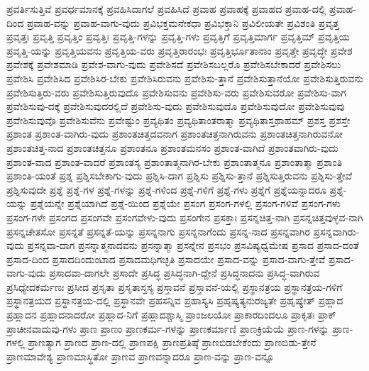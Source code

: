 {ಪ್ರವರ್ತಿಸುತ್ತಿವೆ
ಪ್ರವರ್ಧಮಾನಕ್ಕೆ
ಪ್ರವಹಿಸಿದಾಗಲೆ
ಪ್ರವಹಿಸಿದೆ
ಪ್ರವಾಹ
ಪ್ರವಾಹಕ್ಕೆ
ಪ್ರವಾಹದ
ಪ್ರವಾಹ-ದಲ್ಲಿ
ಪ್ರವಾಹ-ದಿಂದ
ಪ್ರವಾಹ-ವನ್ನು
ಪ್ರವಾಹ-ವಾಗು-ವುದು
ಪ್ರವಿಭಕ್ತಮನೇಕಧಾ
ಪ್ರವಿಭಕ್ತಾನಿ
ಪ್ರವಿಲೀಯತೇ
ಪ್ರವಿಶಂತಿ
ಪ್ರವೃತ್ತ
ಪ್ರವೃತ್ತಃ
ಪ್ರವೃತ್ತಿ
ಪ್ರವೃತ್ತಿಂ
ಪ್ರವೃತ್ತಿಃ
ಪ್ರವೃತ್ತಿ-ಗಳನ್ನು
ಪ್ರವೃತ್ತಿ-ಗಳು
ಪ್ರವೃತ್ತಿಗೆ
ಪ್ರವೃತ್ತಿಮಾರ್ಗ
ಪ್ರವೃತ್ತಿಮ್
ಪ್ರವೃತ್ತಿಯ
ಪ್ರವೃತ್ತಿ-ಯನ್ನು
ಪ್ರವೃತ್ತಿಯವನು
ಪ್ರವೃತ್ತಿಯ-ವರು
ಪ್ರವೃತ್ತಿರಾರಂಭಃ
ಪ್ರವೃತ್ತಿರ್ಭೂತಾನಾಂ
ಪ್ರವೃತ್ತೇ
ಪ್ರವೃದ್ಧೇ
ಪ್ರವೇಶ
ಪ್ರವೇಶಕ್ಕೆ
ಪ್ರವೇಶಮಾಡಿ
ಪ್ರವೇಶ-ವಾಗು-ವುದು
ಪ್ರವೇಶಿಸದೆ
ಪ್ರವೇಶಿಸಬಲ್ಲರೊ
ಪ್ರವೇಶಿಸಬೇಕಾದರೆ
ಪ್ರವೇಶಿಸಲು
ಪ್ರವೇಶಿಸಿ
ಪ್ರವೇಶಿಸಿದ
ಪ್ರವೇಶಿಸಿರ-ಬೇಕು
ಪ್ರವೇಶಿಸಿರುವನು
ಪ್ರವೇಶಿಸು-ತ್ತಾನೆ
ಪ್ರವೇಶಿಸುತ್ತಾನೆಯೋ
ಪ್ರವೇಶಿಸುತ್ತಿರುವನು
ಪ್ರವೇಶಿಸುತ್ತಿರು-ವರು
ಪ್ರವೇಶಿಸುತ್ತಿರುವುದೊ
ಪ್ರವೇಶಿಸುವನು
ಪ್ರವೇಶಿಸು-ವರು
ಪ್ರವೇಶಿಸುವರೋ
ಪ್ರವೇಶಿಸು-ವಾಗ
ಪ್ರವೇಶಿಸುವು-ದಕ್ಕೆ
ಪ್ರವೇಶಿಸುವುದರಲ್ಲಿದೆ
ಪ್ರವೇಶಿಸು-ವುದು
ಪ್ರವೇಶಿಸುವುದೊ
ಪ್ರವೇಶಿಸುವುದೋ
ಪ್ರವೇಶಿಸುವುವು
ಪ್ರವೇಶಿಸುವುವೊ
ಪ್ರವೇಶಿಸುವೆನು
ಪ್ರವೇಷ್ಟುಂ
ಪ್ರವ್ಯಥಿತಂ
ಪ್ರವ್ಯಥಿತಾಂತರಾತ್ಮಾ
ಪ್ರವ್ಯಥಿತಾಸ್ತಥಾಹಮ್
ಪ್ರಶಸ್ತ
ಪ್ರಶಸ್ತೇ
ಪ್ರಶಾಂತ
ಪ್ರಶಾಂತ-ವಾಗಿರು-ವುದು
ಪ್ರಶಾಂತಚಿತ್ತದವನಾಗ
ಪ್ರಶಾಂತಚಿತ್ತನಾಗಿರುವನು
ಪ್ರಶಾಂತಚಿತ್ತನಾಗಿರುವನೋ
ಪ್ರಶಾಂತಚಿತ್ತ-ನಾದ
ಪ್ರಶಾಂತಚಿತ್ತನೂ
ಪ್ರಶಾಂತನೂ
ಪ್ರಶಾಂತಮನಸಂ
ಪ್ರಶಾಂತ-ವಾಗಿದೆ
ಪ್ರಶಾಂತವಾಗಿರು-ವುದು
ಪ್ರಶಾಂತ-ವಾದ
ಪ್ರಶಾಂತ-ವಾದರೆ
ಪ್ರಶಾಂತಸ್ಯ
ಪ್ರಶಾಂತಾತ್ಮನಾಗಿರ-ಬೇಕು
ಪ್ರಶಾಂತಾತ್ಮನೂ
ಪ್ರಶಾಂತಾತ್ಮಾ
ಪ್ರಶಾಂತಿ
ಪ್ರಶಾಂತಿ-ಯಂತೆ
ಪ್ರಶ್ನ
ಪ್ರಶ್ನಿಸಬೇಕಾಗು-ವುದು
ಪ್ರಶ್ನಿಸಿ-ದಾಗ
ಪ್ರಶ್ನಿಸು
ಪ್ರಶ್ನಿಸು-ತ್ತಾನೆ
ಪ್ರಶ್ನಿಸುತ್ತಿರುವನು
ಪ್ರಶ್ನಿಸು-ತ್ತೇವೆ
ಪ್ರಶ್ನಿಸುವುದೇ
ಪ್ರಶ್ನೆ
ಪ್ರಶ್ನೆ-ಗಳ
ಪ್ರಶ್ನೆ-ಗಳನ್ನು
ಪ್ರಶ್ನೆ-ಗಳಿಂದ
ಪ್ರಶ್ನೆ-ಗಳಿಗೆ
ಪ್ರಶ್ನೆ-ಗಳು
ಪ್ರಶ್ನೆಗೆ
ಪ್ರಶ್ನೆಯನ್ನಾದರೂ
ಪ್ರಶ್ನೆ-ಯನ್ನು
ಪ್ರಶ್ನೆಯನ್ನೇ
ಪ್ರಶ್ನೆಯಾಗಿದೆ
ಪ್ರಶ್ನೆ-ಯಿಂದ
ಪ್ರಶ್ನೆಯೇ
ಪ್ರಸಂಗ
ಪ್ರಸಂಗ-ಗಳಲ್ಲಿ
ಪ್ರಸಂಗ-ಗಳಿವೆ
ಪ್ರಸಂಗ-ಗಳು
ಪ್ರಸಂಗ-ಗಳೇ
ಪ್ರಸಂಗದ
ಪ್ರಸಂಗವೇ
ಪ್ರಸಂಗವೇಳು-ವುದು
ಪ್ರಸಂಗೇನ
ಪ್ರಸಕ್ತಾಃ
ಪ್ರಸನ್ನಚಿತ್ತ-ನಾಗಿ
ಪ್ರಸನ್ನಚಿತ್ತವುಳ್ಳವ-ನಾಗಿ
ಪ್ರಸನ್ನಚೇತಸೋ
ಪ್ರಸನ್ನತೆ
ಪ್ರಸನ್ನತೆ-ಯನ್ನು
ಪ್ರಸನ್ನನಾಗು
ಪ್ರಸನ್ನನಾಗೆಂದು
ಪ್ರಸನ್ನ-ನಾದ
ಪ್ರಸನ್ನವಾಗಿರ
ಪ್ರಸನ್ನವಾಗಿರು-ವುದು
ಪ್ರಸನ್ನವಾ-ದಾಗ
ಪ್ರಸನ್ನಾತ್ಮನಾದವನು
ಪ್ರಸನ್ನಾತ್ಮಾ
ಪ್ರಸನ್ನೇನ
ಪ್ರಸಭಂ
ಪ್ರಸವಿಷ್ಯಧ್ವಮೇಷ
ಪ್ರಸಾದ
ಪ್ರಸಾದ-ದಂತೆ
ಪ್ರಸಾದ-ದಿಂದ
ಪ್ರಸಾದದಿಂದುಂಟಾದ
ಪ್ರಸಾದಮಧಿಗಚ್ಛತಿ
ಪ್ರಸಾದಯೇ
ಪ್ರಸಾದ-ವನ್ನು
ಪ್ರಸಾದ-ವಾಗು-ತ್ತೇವೆ
ಪ್ರಸಾದ-ವಾಗು-ವುದು
ಪ್ರಸಾದವಾ-ದಾಗಲೇ
ಪ್ರಸಾದೇ
ಪ್ರಸಿದ್ಧ
ಪ್ರಸಿದ್ಧನಾಗಿ-ದ್ದೇನೆ
ಪ್ರಸಿದ್ಧನಾದನು
ಪ್ರಸಿದ್ಧ-ವಾಗಿರುವ
ಪ್ರಸಿಧ್ಯೇದಕರ್ಮಣಃ
ಪ್ರಸೀದ
ಪ್ರಸೃತಾ
ಪ್ರಸೃತಾಸ್ತಸ್ಯ
ಪ್ರಸ್ತಾವನೆ
ಪ್ರಸ್ತಾವನೆ-ಯಲ್ಲಿ
ಪ್ರಸ್ಥಾನತ್ರಯ
ಪ್ರಸ್ಥಾನತ್ರಯ-ಗಳಿಗೆ
ಪ್ರಸ್ಥಾನತ್ರಯದ
ಪ್ರಸ್ಥಾನತ್ರಯ-ದಲ್ಲಿ
ಪ್ರಸ್ಥಾನವೇ
ಪ್ರಹಸನ್ನಿವ
ಪ್ರಹಾಸ್ಯಸಿ
ಪ್ರಹೃಷ್ಯತ್ಯನುರಜ್ಯತೇ
ಪ್ರಹೃಷ್ಯೇತ್
ಪ್ರಹ್ಲಾದ
ಪ್ರಹ್ಲಾದನ
ಪ್ರಹ್ಲಾದನಾದರೋ
ಪ್ರಹ್ಲಾದ-ನಿಗೆ
ಪ್ರಹ್ಲಾದಶ್ಚಾಸ್ಮಿ
ಪ್ರಾಂಜಲಯೋ
ಪ್ರಾಕಾರದಿಂದಲೂ
ಪ್ರಾಕೃತಃ
ಪ್ರಾಕ್
ಪ್ರಾಚೀನವಾದುವು-ಗಳು
ಪ್ರಾಣ
ಪ್ರಾಣಂ
ಪ್ರಾಣಕರ್ಮ-ಗಳನ್ನು
ಪ್ರಾಣಕರ್ಮಾಣಿ
ಪ್ರಾಣಕ್ರಿಯೆಯೆ
ಪ್ರಾಣ-ಗಳನ್ನು
ಪ್ರಾಣ-ಗಳಲ್ಲಿ
ಪ್ರಾಣತ್ಯಾಗ
ಪ್ರಾಣದ
ಪ್ರಾಣ-ದಲ್ಲಿ
ಪ್ರಾಣಪಕ್ಷಿ
ಪ್ರಾಣಪ್ರತಿಷ್ಠೆ
ಪ್ರಾಣಬಿಡಬೇಕೆಂದು
ಪ್ರಾಣಬಿಡು-ತ್ತೇನೆ
ಪ್ರಾಣಮಾವೇಶ್ಯ
ಪ್ರಾಣಮಾಸ್ಥಿತೋ
ಪ್ರಾಣವ
ಪ್ರಾಣವನ್ನಾದರೂ
ಪ್ರಾಣ-ವನ್ನು
ಪ್ರಾಣ-ವನ್ನೂ
}
